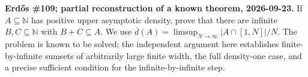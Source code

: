 \textbf{Erd\H{o}s \#109; partial reconstruction of a known theorem, 2026-09-23.}
If $A\subseteq\mathbb N$ has positive upper asymptotic density, prove that there are infinite $B,C\subseteq\mathbb N$ with $B+C\subseteq A$. We use $\overline d(A)=\limsup_{N\to\infty}|A\cap[1,N]|/N$. The problem is known to be solved; the independent argument here establishes finite-by-infinite sumsets of arbitrarily large finite width, the full density-one case, and a precise sufficient condition for the infinite-by-infinite step.
